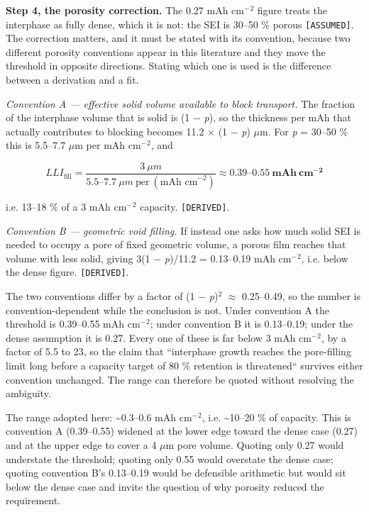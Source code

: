 \documentclass[11pt,a4paper]{article}
\begin{document}
\textbf{Step 4, the porosity correction.} The 0.27 mAh cm\ensuremath{^{-}}\ensuremath{^{2}} figure treats the interphase as fully dense, which it is not: the SEI is 30--50 \% porous \texttt{[ASSUMED]}. The correction matters, and it must be stated with its convention, because two different porosity conventions appear in this literature and they move the threshold in opposite directions. Stating which one is used is the difference between a derivation and a fit.


\emph{Convention A --- effective solid volume available to block transport.} The fraction of the interphase volume that is solid is (1 \ensuremath{-} \emph{p}), so the thickness per mAh that actually contributes to blocking becomes 11.2 \ensuremath{\times} (1 \ensuremath{-} \emph{p}) \ensuremath{\mu}m. For \emph{p} = 30--50 \% this is 5.5--7.7 \ensuremath{\mu}m per mAh cm\ensuremath{^{-}}\ensuremath{^{2}}, and


\begin{equation}LLI_{\text{fill}} = \frac{3\ \mu m}{5.5\text{--}7.7\ \mu m\ \text{per}\ (\text{mAh cm}^{-2})} \approx \mathbf{0.39\text{--}0.55\ mAh\ cm^{-2}} \tag{S2.E10}\end{equation}


i.e. 13--18 \% of a 3 mAh cm\ensuremath{^{-}}\ensuremath{^{2}} capacity. \texttt{[DERIVED]}.


\emph{Convention B --- geometric void filling.} If instead one asks how much solid SEI is needed to occupy a pore of fixed geometric volume, a porous film reaches that volume with less solid, giving 3(1 \ensuremath{-} \emph{p})/11.2 = 0.13--0.19 mAh cm\ensuremath{^{-}}\ensuremath{^{2}}, i.e. below the dense figure. \texttt{[DERIVED]}.


The two conventions differ by a factor of (1 \ensuremath{-} \emph{p})\ensuremath{^{2}} \ensuremath{\approx} 0.25--0.49, so the number is convention-dependent while the conclusion is not. Under convention A the threshold is 0.39--0.55 mAh cm\ensuremath{^{-}}\ensuremath{^{2}}; under convention B it is 0.13--0.19; under the dense assumption it is 0.27. Every one of these is far below 3 mAh cm\ensuremath{^{-}}\ensuremath{^{2}}, by a factor of 5.5 to 23, so the claim that \textquotedblleft{}interphase growth reaches the pore-filling limit long before a capacity target of 80 \% retention is threatened\textquotedblleft{} survives either convention unchanged. The range can therefore be quoted without resolving the ambiguity.


The range adopted here: \textasciitilde{}0.3--0.6 mAh cm\ensuremath{^{-}}\ensuremath{^{2}}, i.e. \textasciitilde{}10--20 \% of capacity. This is convention A (0.39--0.55) widened at the lower edge toward the dense case (0.27) and at the upper edge to cover a 4 \ensuremath{\mu}m pore volume. Quoting only 0.27 would understate the threshold; quoting only 0.55 would overstate the dense case; quoting convention B's 0.13--0.19 would be defensible arithmetic but would sit below the dense case and invite the question of why porosity reduced the requirement.
\end{document}
